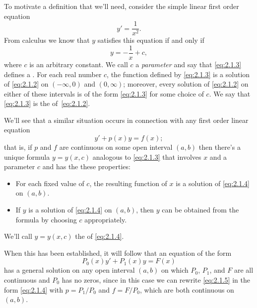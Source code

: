 
To motivate a definition that we'll need, consider the
simple linear first order equation
\begin{equation}\label{eq:2.1.2}
y'=\frac{1}{x^2}.
\end{equation}
From calculus we know that $y$ satisfies this equation
if and only if
\begin{equation}\label{eq:2.1.3}
y=-\frac{1}{x}+c,
\end{equation}
where $c$ is an arbitrary constant.
We call $c$ a
\emph{\color{blue}parameter} and say that \eqref{eq:2.1.3} defines a
.
For each real number $c$, the
function defined by \eqref{eq:2.1.3} is a solution of \eqref{eq:2.1.2}
on $(-\infty,0)$ and $(0,\infty)$;     moreover, every solution of
\eqref{eq:2.1.2} on either of these intervals is of the form
\eqref{eq:2.1.3} for some choice of $c$. We say that \eqref{eq:2.1.3}
is the  of~\eqref{eq:2.1.2}.

We'll  see that a similar situation occurs in connection with any
first order linear equation
\begin{equation}\label{eq:2.1.4}
y'+p(x)y=f(x);
\end{equation}
that is, if $p$ and $f$ are continuous on some open interval $(a,b)$ then
 there's a unique formula $y=y(x,c)$ analogous to \eqref{eq:2.1.3}
that involves $x$ and a parameter $c$ and has  the these
properties:
\begin{itemize}
\item %
For each fixed value of $c$, the resulting function of $x$ is a
solution of \eqref{eq:2.1.4} on $(a,b)$.
\item %
If $y$ is a solution of \eqref{eq:2.1.4} on $(a,b)$, then $y$ can be
obtained from the formula by choosing $c$ appropriately.
\end{itemize}
We'll call $y=y(x,c)$ the  of
\eqref{eq:2.1.4}.

When this has been established, it will follow that
an equation of the form
\begin{equation}\label{eq:2.1.5}
P_0(x)y'+P_1(x)y=F(x)
\end{equation}
has a general solution on  any open interval $(a,b)$ on which $P_0$,
$P_1$, and $F$ are all continuous and $P_0$ has no zeros, since in
this case we can rewrite \eqref{eq:2.1.5} in the form \eqref{eq:2.1.4}
with $p=P_1/P_0$ and $f=F/P_0$, which are both continuous on $(a,b)$.

